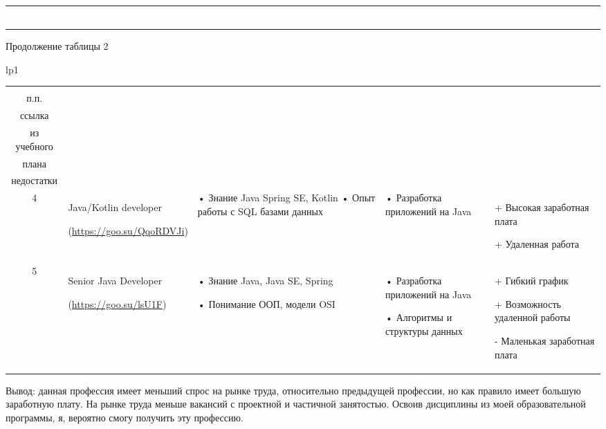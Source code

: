 \documentclass[14pt]{extreport}
\begin{document}
\begin{landscape}
\begin{longtable}[H]{lp{1\linewidth}}
\begin{small}
\begin{tabular}{|c|p{}|p{6cm}|p{5cm}|p{5cm}|}
    \end{tabular}
    \end{small}
\end{longtable}




\addtocounter{table}{-1}
\newpage
Продолжение таблицы 2
\begin{longtable}[H]{lp{1\linewidth}}
\caption{Продолжение таблицы 2}

\centering

\begin{small}


    \begin{tabular}{|c|p{}|p{6cm}|p{5cm}|p{5cm}|}
	\hline 
	\makecell{№ \\ п.п.} &	\makecell{Название должности,\\ ссылка} &	\makecell{Требования} & 	\makecell{Дисциплины \\ из учебного \\плана} &	\makecell{Преимущества и \\недостатки}  \\ 
	\hline 
	4	& Java/Kotlin developer
	
(\url{https://goo.su/QqoRDVJi}) &
•	Знание Java Spring SE, Kotlin 
•	Опыт работы с SQL базами данных 
& 
•	Разработка приложений на Java &
+	Высокая заработная плата

+	Удаленная работа

 \\

	\hline
5	& Senior Java Developer

(\url{https://goo.su/lsU1F}) &
•	Знание Java, Java SE, Spring

•	Понимание ООП, модели OSI
 &
•	Разработка приложений на Java

•	Алгоритмы и структуры данных &
+	Гибкий график

+	Возможность удаленной работы

-	Маленькая заработная плата \\


	\hline 


    \end{tabular}
    \end{small}
\end{longtable}
Вывод: данная профессия имеет меньший спрос на рынке труда, относительно предыдущей профессии, но как правило имеет большую заработную плату. На рынке труда меньше вакансий с проектной и частичной занятостью.  Освоив дисциплины из моей образовательной программы, я, вероятно смогу получить эту профессию.








\end{landscape}
\end{document}
